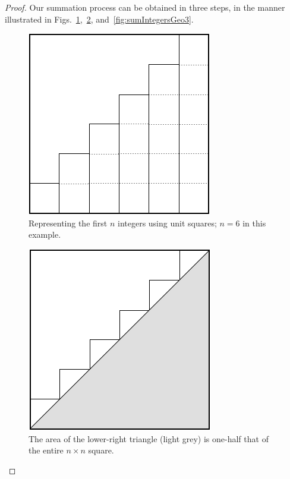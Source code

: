 \begin{proof}
Our summation process can be obtained in three steps, in the manner
illustrated in
Figs.~\ref{fig:sumIntegersGeo1},~\ref{fig:sumIntegersGeo2},
and~\ref{fig:sumIntegersGeo3}.
\begin{figure}[ht]
\begin{center}
       \includegraphics[scale=0.35]{FiguresMaths/SumIntegersGeometricBasis}
\caption{Representing the first $n$ integers using unit squares; $n=6$ in this example.}
       \label{fig:sumIntegersGeo1}
\end{center}
\end{figure}
\begin{figure}[ht]
\begin{center}
       \includegraphics[scale=0.35]{FiguresMaths/SumIntegersGeometricIntermediate}
\caption{The area of the lower-right triangle (light grey) is one-half that of
  the entire $n \times n$ square.}
       \label{fig:sumIntegersGeo2}
\end{center}
\end{figure}
\begin{figure}[ht]

\end{figure}
\end{proof}
